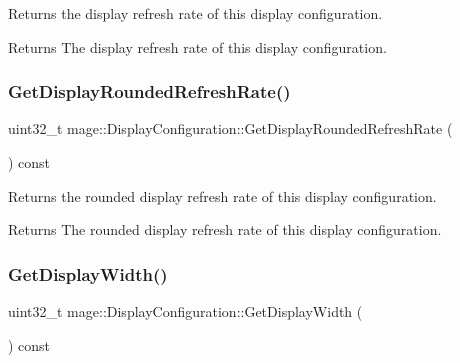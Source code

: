Returns the display refresh rate of this display configuration.

\begin{DoxyReturn}{Returns}
The display refresh rate of this display configuration. 
\end{DoxyReturn}
\hypertarget{structmage_1_1_display_configuration_a70ad309284f4741f7ce9aafc38577715}{}\label{structmage_1_1_display_configuration_a70ad309284f4741f7ce9aafc38577715} 
\subsubsection{\texorpdfstring{Get\+Display\+Rounded\+Refresh\+Rate()}{GetDisplayRoundedRefreshRate()}}
{\footnotesize\ttfamily uint32\+\_\+t mage\+::\+Display\+Configuration\+::\+Get\+Display\+Rounded\+Refresh\+Rate (\begin{DoxyParamCaption}{ }\end{DoxyParamCaption}) const\hspace{0.3cm}{\ttfamily [noexcept]}}

Returns the rounded display refresh rate of this display configuration.

\begin{DoxyReturn}{Returns}
The rounded display refresh rate of this display configuration. 
\end{DoxyReturn}
\hypertarget{structmage_1_1_display_configuration_abb8e00caf3bf4fbe3948657d760b760f}{}\label{structmage_1_1_display_configuration_abb8e00caf3bf4fbe3948657d760b760f} 
\subsubsection{\texorpdfstring{Get\+Display\+Width()}{GetDisplayWidth()}}
{\footnotesize\ttfamily uint32\+\_\+t mage\+::\+Display\+Configuration\+::\+Get\+Display\+Width (\begin{DoxyParamCaption}{ }\end{DoxyParamCaption}) const\hspace{0.3cm}{\ttfamily [noexcept]}}


